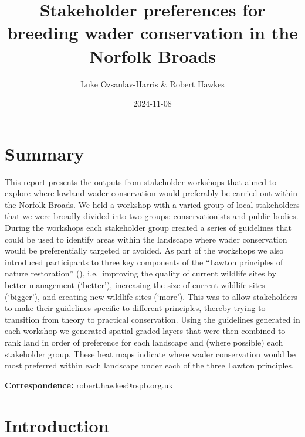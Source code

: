 \documentclass[
  12pt,
  letterpaper,
  DIV=11,
  numbers=noendperiod]{scrartcl}
\title{Stakeholder preferences for breeding wader conservation in the
Norfolk Broads}
\author{Luke Ozsanlav-Harris \& Robert Hawkes}
\date{2024-11-08}
\begin{document}
\maketitle


\section{Summary}\label{summary}

This report presents the outputs from stakeholder workshops that aimed
to explore where lowland wader conservation would preferably be carried
out within the Norfolk Broads. We held a workshop with a varied group of
local stakeholders that we were broadly divided into two groups:
conservationists and public bodies. During the workshops each
stakeholder group created a series of guidelines that could be used to
identify areas within the landscape where wader conservation would be
preferentially targeted or avoided. As part of the workshops we also
introduced participants to three key components of the ``Lawton
principles of nature restoration'' (), i.e.~improving the quality of current wildlife sites by
better management (`better'), increasing the size of current wildlife
sites (`bigger'), and creating new wildlife sites (`more'). This was to
allow stakeholders to make their guidelines specific to different
principles, thereby trying to transition from theory to practical
conservation. Using the guidelines generated in each workshop we
generated spatial graded layers that were then combined to rank land in
order of preference for each landscape and (where possible) each
stakeholder group. These heat maps indicate where wader conservation
would be most preferred within each landscape under each of the three
Lawton principles.

\textbf{Correspondence:} robert.hawkes@rspb.org.uk

\newpage{}

\section{Introduction}\label{introduction}
\end{document}
